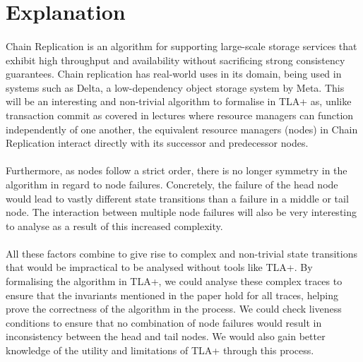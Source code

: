 \section{Explanation}
\setcounter{subsection}{0}
\renewcommand*{\thesubsection}{\Alph{subsection}.}

\paragraph{}
Chain Replication is an algorithm for supporting large-scale storage services that exhibit high throughput and availability without sacrificing strong consistency guarantees. Chain replication has real-world uses in its domain, being used in systems such as Delta, a low-dependency object storage system by Meta. This will be an interesting and non-trivial algorithm to formalise in TLA+ as, unlike transaction commit as covered in lectures where resource managers can function independently of one another, the equivalent resource managers (nodes) in Chain Replication interact directly with its successor and predecessor nodes.

\paragraph{}
Furthermore, as nodes follow a strict order, there is no longer symmetry in the algorithm in regard to node failures. Concretely, the failure of the head node would lead to vastly different state transitions than a failure in a middle or tail node. The interaction between multiple node failures will also be very interesting to analyse as a result of this increased complexity.  

\paragraph{}
All these factors combine to give rise to complex and non-trivial state transitions that would be impractical to be analysed without tools like TLA+. By formalising the algorithm in TLA+, we could analyse these complex traces to ensure that the invariants mentioned in the paper hold for all traces, helping prove the correctness of the algorithm in the process. We could check liveness conditions to ensure that no combination of node failures would result in inconsistency between the head and tail nodes. We would also gain better knowledge of the utility and limitations of TLA+ through this process.
